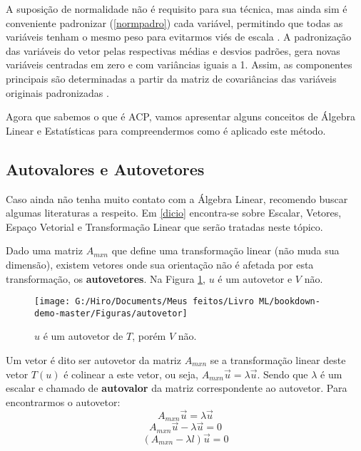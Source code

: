 \documentclass[
]{book}
\begin{document}
A suposição de normalidade não é requisito para sua técnica, mas ainda sim é conveniente padronizar (\ref{normpadro}) cada variável, permitindo que todas as variáveis tenham o mesmo peso para evitarmos viés de escala \citep{hongyu2016analise}. A padronização das variáveis do vetor pelas respectivas médias e desvios padrões, gera novas variáveis centradas em zero e com variâncias iguais a 1. Assim, as componentes principais são determinadas a partir da matriz de covariâncias das variáveis originais padronizadas \citep{mingoti2007analise}.

Agora que sabemos o que é ACP, vamos apresentar alguns conceitos de Álgebra Linear e Estatísticas para compreendermos como é aplicado este método.

\hypertarget{autovalores-e-autovetores}{%
\subsection{Autovalores e Autovetores}\label{autovalores-e-autovetores}}

Caso ainda não tenha muito contato com a Álgebra Linear, recomendo buscar algumas literaturas a respeito. Em \ref{dicio} encontra-se sobre Escalar, Vetores, Espaço Vetorial e Transformação Linear que serão tratadas neste tópico.

Dado uma matriz \(A_{mxn}\) que define uma transformação linear (não muda sua dimensão), existem vetores onde sua orientação não é afetada por esta transformação, os \textbf{autovetores}. Na Figura \ref{fig:autovetor}, \(u\) é um autovetor e \(V\) não.

\begin{figure}

{\centering \texttt{[image: G:/Hiro/Documents/Meus feitos/Livro ML/bookdown-demo-master/Figuras/autovetor]} 

}

\caption{\(u\) é um autovetor de \(T\), porém \(V\) não.}\label{fig:autovetor}
\end{figure}



Um vetor é dito ser autovetor da matriz \(A_{mxn}\) se a transformação linear deste vetor \(T(u)\) é colinear a este vetor, ou seja, \(A_{mxn}\vec{u}=\lambda \vec{u}\). Sendo que \(\lambda\) é um escalar e chamado de \textbf{autovalor} da matriz correspondente ao autovetor. Para encontrarmos o autovetor:
\[A_{mxn}\vec{u}=\lambda \vec{u} \]
\[A_{mxn}\vec{u}-\lambda \vec{u}=0 \]
\begin{equation}
(A_{mxn}-\lambda l)\vec{u}=0
    \label{eq:autovetor}
\end{equation}
\end{document}
